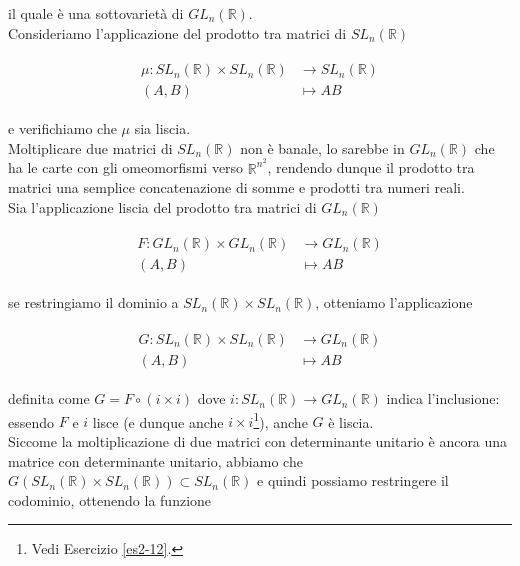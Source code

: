 il quale è una sottovarietà di $ GL_{n}(\mathbb{R}) $.\\
Consideriamo l'applicazione del prodotto tra matrici di $ SL_{n}(\mathbb{R}) $

\begin{align}
	\begin{split}
		\mu : SL_{n}(\mathbb{R}) \times SL_{n}(\mathbb{R}) &\to SL_{n}(\mathbb{R})\\
		(A,B) &\mapsto A B
	\end{split}
\end{align}

e verifichiamo che $ \mu $ sia liscia.\\
Moltiplicare due matrici di $ SL_{n}(\mathbb{R}) $ non è banale, lo sarebbe in $ GL_{n}(\mathbb{R}) $ che ha le carte con gli omeomorfismi verso $ \mathbb{R}^{n^{2}} $, rendendo dunque il prodotto tra matrici una semplice concatenazione di somme e prodotti tra numeri reali.\\
Sia l'applicazione liscia del prodotto tra matrici di $ GL_{n}(\mathbb{R}) $

\begin{align}
	\begin{split}
		F : GL_{n}(\mathbb{R}) \times GL_{n}(\mathbb{R}) &\to GL_{n}(\mathbb{R})\\
		(A,B) &\mapsto A B
	\end{split}
\end{align}

se restringiamo il dominio a $ SL_{n}(\mathbb{R}) \times SL_{n}(\mathbb{R}) $, otteniamo l'applicazione

\begin{align}
	\begin{split}
		G : SL_{n}(\mathbb{R}) \times SL_{n}(\mathbb{R}) &\to GL_{n}(\mathbb{R})\\
		(A,B) &\mapsto A B
	\end{split}
\end{align}

definita come $ G = F \circ (i \times i) $ dove $ i : SL_{n}(\mathbb{R}) \to GL_{n}(\mathbb{R}) $ indica l'inclusione: essendo $ F $ e $ i $ lisce (e dunque anche $ i \times i $\footnote{%
	Vedi Esercizio \ref{es2-12}.%
}), anche $ G $ è liscia.\\
Siccome la moltiplicazione di due matrici con determinante unitario è ancora una matrice con determinante unitario, abbiamo che $ G(SL_{n}(\mathbb{R}) \times SL_{n}(\mathbb{R})) \subset SL_{n}(\mathbb{R}) $ e quindi possiamo restringere il codominio, ottenendo la funzione

